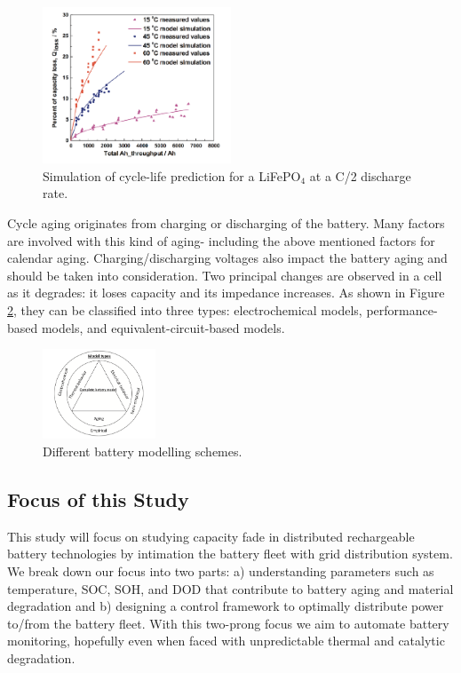 \documentclass[10]{IEEEtran}
\begin{document}
	\begin{figure}[htbp]
		\centerline{\includegraphics[keepaspectratio,height=0.5\textheight, width=0.5\textwidth]{fig4.png}}
		\caption{Simulation of cycle-life prediction for a LiFePO$_4$ at a C/2 discharge rate. \cite{b5}}
		\label{f3}
	\end{figure}
	
	Cycle aging originates from charging or discharging of the battery. Many factors are involved with this kind of aging- including the above mentioned factors for calendar aging. Charging/discharging voltages also impact the battery aging and should be taken into consideration. Two principal changes are observed in a cell as it degrades: it loses capacity and its impedance increases. As shown in Figure \ref{f4}, they can be classified into three types: electrochemical models, performance-based models, and equivalent-circuit-based models.
	
	\begin{figure}[htbp]
		\centerline{\includegraphics[keepaspectratio,height=0.3\textheight, width=0.3\textwidth]{fig5.png}}
		\caption{Different battery modelling schemes. \cite{b7}}
		\label{f4}
	\end{figure}

	\subsection{Focus of this Study}
	This study will focus on studying capacity fade in distributed rechargeable battery technologies by intimation the battery fleet with grid distribution system. We break down our focus into two parts: a) understanding parameters such as temperature, SOC, SOH, and DOD that contribute to battery aging and material degradation and b) designing a control framework to optimally distribute power to/from the battery fleet. With this two-prong focus we aim to automate battery monitoring, hopefully even when faced with unpredictable thermal and catalytic degradation.
	
\end{document}
